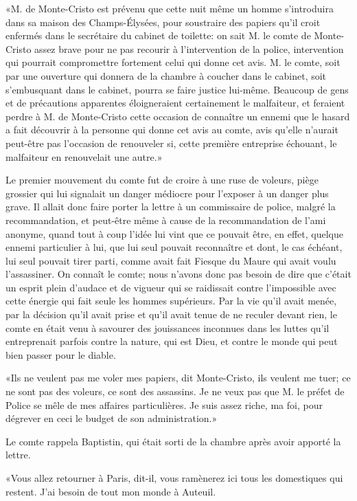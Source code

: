 «M. de Monte-Cristo est prévenu que cette nuit même un homme s'introduira dans sa maison des Champs-Élysées, pour soustraire des papiers qu'il croit enfermés dans le secrétaire du cabinet de toilette: on sait M. le comte de Monte-Cristo assez brave pour ne pas recourir à l'intervention de la police, intervention qui pourrait compromettre fortement celui qui donne cet avis. M. le comte, soit par une ouverture qui donnera de la chambre à coucher dans le cabinet, soit s'embusquant dans le cabinet, pourra se faire justice lui-même. Beaucoup de gens et de précautions apparentes éloigneraient certainement le malfaiteur, et feraient perdre à M. de Monte-Cristo cette occasion de connaître un ennemi que le hasard a fait découvrir à la personne qui donne cet avis au comte, avis qu'elle n'aurait peut-être pas l'occasion de renouveler si, cette première entreprise échouant, le malfaiteur en renouvelait une autre.» 

Le premier mouvement du comte fut de croire à une ruse de voleurs, piège grossier qui lui signalait un danger médiocre pour l'exposer à un danger plus grave. Il allait donc faire porter la lettre à un commissaire de police, malgré la recommandation, et peut-être même à cause de la recommandation de l'ami anonyme, quand tout à coup l'idée lui vint que ce pouvait être, en effet, quelque ennemi particulier à lui, que lui seul pouvait reconnaître et dont, le cas échéant, lui seul pouvait tirer parti, comme avait fait Fiesque du Maure qui avait voulu l'assassiner. On connaît le comte; nous n'avons donc pas besoin de dire que c'était un esprit plein d'audace et de vigueur qui se raidissait contre l'impossible avec cette énergie qui fait seule les hommes supérieurs. Par la vie qu'il avait menée, par la décision qu'il avait prise et qu'il avait tenue de ne reculer devant rien, le comte en était venu à savourer des jouissances inconnues dans les luttes qu'il entreprenait parfois contre la nature, qui est Dieu, et contre le monde qui peut bien passer pour le diable. 

«Ils ne veulent pas me voler mes papiers, dit Monte-Cristo, ils veulent me tuer; ce ne sont pas des voleurs, ce sont des assassins. Je ne veux pas que M. le préfet de Police se mêle de mes affaires particulières. Je suis assez riche, ma foi, pour dégrever en ceci le budget de son administration.» 

Le comte rappela Baptistin, qui était sorti de la chambre après avoir apporté la lettre. 

«Vous allez retourner à Paris, dit-il, vous ramènerez ici tous les domestiques qui restent. J'ai besoin de tout mon monde à Auteuil. 

